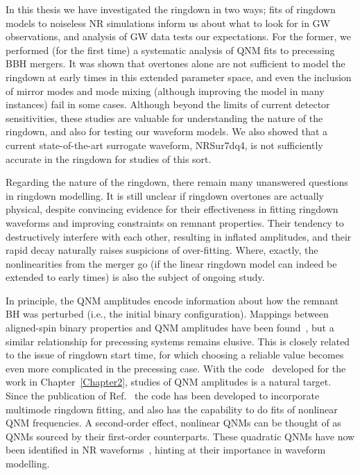 \documentclass[
12pt, %
english, %
doublespacing, %
headsepline, %
]{MastersDoctoralThesis} %
\begin{document}
In this thesis we have investigated the ringdown in two ways; fits of ringdown models to noiseless NR simulations inform us about what to look for in GW observations, and analysis of GW data tests our expectations.
For the former, we performed (for the first time) a systematic analysis of QNM fits to precessing BBH mergers.
It was shown that overtones alone are not sufficient to model the ringdown at early times in this extended parameter space, and even the inclusion of mirror modes and mode mixing (although improving the model in many instances) fail in some cases.
Although beyond the limits of current detector sensitivities, these studies are valuable for understanding the nature of the ringdown, and also for testing our waveform models.
We also showed that a current state-of-the-art surrogate waveform, NRSur7dq4, is not sufficiently accurate in the ringdown for studies of this sort.

Regarding the nature of the ringdown, there remain many unanswered questions in ringdown modelling. 
It is still unclear if ringdown overtones are actually physical, despite convincing evidence for their effectiveness in fitting ringdown waveforms and improving constraints on remnant properties.
Their tendency to destructively interfere with each other, resulting in inflated amplitudes, and their rapid decay naturally raises suspicions of over-fitting.
Where, exactly, the nonlinearities from the merger go (if the linear ringdown model can indeed be extended to early times) is also the subject of ongoing study.

In principle, the QNM amplitudes encode information about how the remnant BH was perturbed (i.e., the initial binary configuration).
Mappings between aligned-spin binary properties and QNM amplitudes have been found~\cite{London:2014cma}, but a similar relationship for precessing systems remains elusive.
This is closely related to the issue of ringdown start time, for which choosing a reliable value becomes even more complicated in the precessing case.
With the code~\cite{qnmfits} developed for the work in Chapter~\ref{Chapter2}, studies of QNM amplitudes is a natural target.
Since the publication of Ref.~\cite{Finch:2021iip} the code has been developed to incorporate multimode ringdown fitting, and also has the capability to do fits of nonlinear QNM frequencies.
A second-order effect, nonlinear QNMs can be thought of as QNMs sourced by their first-order counterparts.
These quadratic QNMs have now been identified in NR waveforms~\cite{Cheung:2022rbm, Mitman:2022qdl}, hinting at their importance in waveform modelling.
\end{document}
